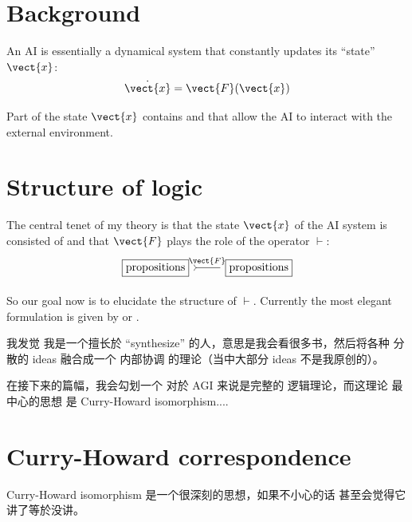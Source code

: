 \tableofcontents


\section{Background}

An AI is essentially a dynamical system that constantly updates its ``state'' $\vect{x}$:
\begin{equation}
\dot{\vect{x}} = \vect{F}(\vect{x})
\end{equation}

Part of the state $\vect{x}$ contains  and  that allow the AI to interact with the external environment.



\section{Structure of logic}

The central tenet of my theory is that the state $\vect{x}$ of the AI system is consisted of  and that $\vect{F}$ plays the role of the  operator $\vdash$:
\begin{equation}
\begin{tikzcd}
\boxed{\mbox{propositions}}
\arrow[r, tail, no head, "\vect{F}"]
& \boxed{\mbox{propositions}}
\end{tikzcd}
\end{equation}

So our goal now is to elucidate the structure of $\vdash$.  Currently the most elegant formulation is given by  or .

我发觉 我是一个擅长於 ``synthesize'' 的人，意思是我会看很多书，然后将各种 分散的 ideas 融合成一个 内部协调 的理论（当中大部分 ideas 不是我原创的）。

在接下来的篇幅，我会勾划一个 对於 AGI 来说是完整的 逻辑理论，而这理论 最中心的思想 是 Curry-Howard isomorphism....

\section{Curry-Howard correspondence}

Curry-Howard isomorphism 是一个很深刻的思想，如果不小心的话 甚至会觉得它讲了等於没讲。 



